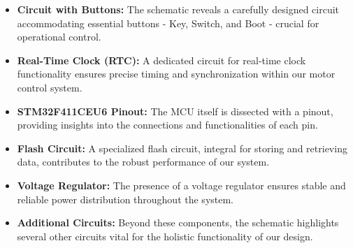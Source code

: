 \begin{itemize}
    \item \textbf{Circuit with Buttons:} The schematic reveals a carefully designed circuit accommodating essential buttons - Key, Switch, and Boot - crucial for operational control.

    \item \textbf{Real-Time Clock (RTC):} A dedicated circuit for real-time clock functionality ensures precise timing and synchronization within our motor control system.

    \item \textbf{STM32F411CEU6 Pinout:} The MCU itself is dissected with a pinout, providing insights into the connections and functionalities of each pin.

    \item \textbf{Flash Circuit:} A specialized flash circuit, integral for storing and retrieving data, contributes to the robust performance of our system.

    \item \textbf{Voltage Regulator:} The presence of a voltage regulator ensures stable and reliable power distribution throughout the system.

    \item \textbf{Additional Circuits:} Beyond these components, the schematic highlights several other circuits vital for the holistic functionality of our design.
\end{itemize}

